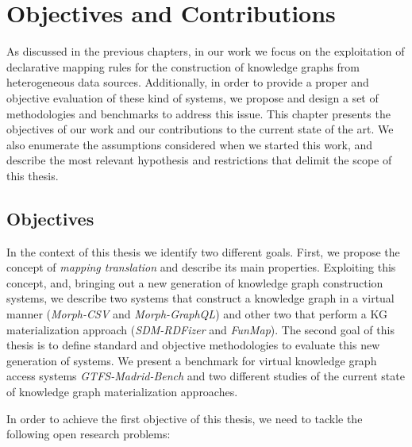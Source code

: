 \chapter{Objectives and Contributions}
\label{chap:objectives}
As discussed in the previous chapters, in our work we focus on the exploitation of declarative mapping rules for the construction of knowledge graphs from heterogeneous data sources. Additionally, in order to provide a proper and objective evaluation of these kind of systems, we propose and design a set of methodologies and benchmarks to address this issue. This chapter presents the objectives of our work and our contributions to the current state of the art. We also enumerate the assumptions considered when we started this work, and describe the most relevant hypothesis and restrictions that delimit the scope of this thesis.

\section{Objectives}
In the context of this thesis we identify two different goals. First, we propose the concept of \textit{mapping translation} and describe its main properties. Exploiting this concept, and, bringing out a new generation of knowledge graph construction systems, we describe two systems that construct a knowledge graph in a virtual manner (\textit{Morph-CSV} and \textit{Morph-GraphQL}) and other two that perform a KG materialization approach (\textit{SDM-RDFizer} and \textit{FunMap}). The second goal of this thesis is to define standard and objective methodologies to evaluate this new generation of systems. We present a benchmark for virtual knowledge graph access systems \textit{GTFS-Madrid-Bench} and two different studies of the current state of knowledge graph materialization approaches.

In order to achieve the first objective of this thesis, we need to tackle the following open research problems:


